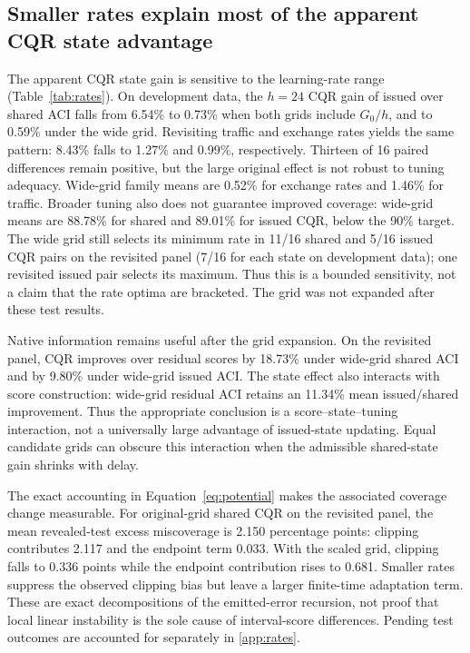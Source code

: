 \documentclass[preprint,11pt]{elsarticle}
\begin{document}
\subsection{Smaller rates explain most of the apparent CQR state advantage}\label{sec:rates}
The apparent CQR state gain is sensitive to the learning-rate range (Table~\ref{tab:rates}).
On development data, the $h=24$ CQR gain of issued over shared ACI falls from 6.54\%
to 0.73\% when both grids include $G_0/h$, and to 0.59\% under the wide grid.
Revisiting traffic and exchange rates yields the same pattern: 8.43\% falls to
1.27\% and 0.99\%, respectively. Thirteen of 16 paired differences remain positive,
but the large original effect is not robust to tuning adequacy. Wide-grid family
means are 0.52\% for exchange rates and 1.46\% for traffic. Broader tuning also does
not guarantee improved coverage: wide-grid means are 88.78\% for shared and 89.01\%
for issued CQR, below the 90\% target.
The wide grid still selects its minimum rate in 11/16 shared and 5/16 issued CQR
pairs on the revisited panel (7/16 for each state on development data); one revisited
issued pair selects its maximum. Thus this is a bounded sensitivity, not a claim
that the rate optima are bracketed. The grid was not expanded after these test results.

\begin{table}[htbp]\centering\scriptsize
\caption{Subsequent learning-rate sensitivity at $h=24$, CQR. Gain is issued versus
shared paired interval-score improvement (\%). S/I denote shared/issued states;
coverage is percent, and local error is in percentage points. Selection uses validation
only. The revisited panel is already inspected data, not a new confirmation test.}
\label{tab:rates}
\end{table}

Native information remains useful after the grid expansion. On the revisited panel,
CQR improves over residual scores by 18.73\% under wide-grid shared ACI and by 9.80\%
under wide-grid issued ACI. The state effect also interacts with score construction:
wide-grid residual ACI retains an 11.34\% mean issued/shared improvement. Thus the
appropriate conclusion is a score--state--tuning interaction, not a universally large
advantage of issued-state updating. Equal candidate grids can obscure this interaction
when the admissible shared-state gain shrinks with delay.

The exact accounting in Equation~\eqref{eq:potential} makes the associated coverage
change measurable. For original-grid shared CQR on the revisited panel, the mean
revealed-test excess miscoverage is 2.150 percentage points: clipping contributes
2.117 and the endpoint term 0.033. With the scaled grid, clipping falls to 0.336
points while the endpoint contribution rises to 0.681. Smaller rates suppress the
observed clipping bias but leave a larger finite-time adaptation term. These are
exact decompositions of the emitted-error recursion, not proof that local linear
instability is the sole cause of interval-score differences. Pending test outcomes
are accounted for separately in \ref{app:rates}.
\end{document}
